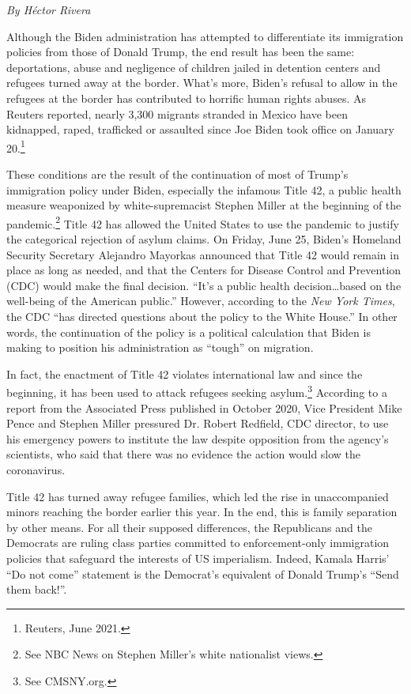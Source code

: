 \emph{By H\'{e}ctor Rivera}

Although the Biden administration has attempted to differentiate its immigration policies from those of Donald Trump, the end result has been the same: deportations, abuse and negligence of children jailed in detention centers and refugees turned away at the border. What's more, Biden's refusal to allow in the refugees at the border has contributed to horrific human rights abuses. As Reuters reported, nearly 3,300 migrants stranded in Mexico have been kidnapped, raped, trafficked or assaulted since Joe Biden took office on January 20.\footnote{Reuters, June 2021.}

These conditions are the result of the continuation of most of Trump's immigration policy under Biden, especially the infamous Title 42, a public health measure weaponized by white-supremacist Stephen Miller at the beginning of the pandemic.\footnote{See NBC News on Stephen Miller's white nationalist views.} Title 42 has allowed the United States to use the pandemic to justify the categorical rejection of asylum claims. On Friday, June 25, Biden's Homeland Security Secretary Alejandro Mayorkas announced that Title 42 would remain in place as long as needed, and that the Centers for Disease Control and Prevention (CDC) would make the final decision. ``It's a public health decision\ldots based on the well-being of the American public.'' However, according to the \emph{New York Times}, the CDC ``has directed questions about the policy to the White House.'' In other words, the continuation of the policy is a political calculation that Biden is making to position his administration as ``tough'' on migration.

In fact, the enactment of Title 42 violates international law and since the beginning, it has been used to attack refugees seeking asylum.\footnote{See CMSNY.org.} According to a report from the Associated Press published in October 2020, Vice President Mike Pence and Stephen Miller pressured Dr. Robert Redfield, CDC director, to use his emergency powers to institute the law despite opposition from the agency's scientists, who said that there was no evidence the action would slow the coronavirus.

Title 42 has turned away refugee families, which led the rise in unaccompanied minors reaching the border earlier this year. In the end, this is family separation by other means. For all their supposed differences, the Republicans and the Democrats are ruling class parties committed to enforcement-only immigration policies that safeguard the interests of US imperialism. Indeed, Kamala Harris' ``Do not come'' statement is the Democrat's equivalent of Donald Trump's ``Send them back!''.

